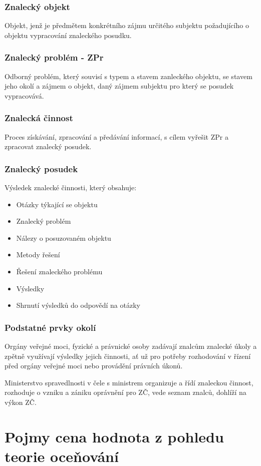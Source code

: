\subsubsection*{Znalecký objekt}
Objekt, jenž je předmětem konkrétního zájmu určitého subjektu požadujícího o objektu vypracování znaleckého posudku.
\subsubsection*{Znalecký problém - ZPr}
Odborný problém, který souvisí s typem a stavem zanleckého objektu, se stavem jeho okolí a zájmem o objekt, daný zájmem subjektu pro který se posudek 
vypracovává.
\subsubsection*{Znalecká činnost}
Proces získávání, zpracování a předávání informací, s cílem vyřešit ZPr a zpracovat znalecký posudek.
\subsubsection*{Znalecký posudek}
Výsledek znalecké činnosti, který obsahuje:
\begin{itemize}
    \item Otázky týkající se objektu
    \item Znalecký problém
    \item Nálezy o posuzovaném objektu
    \item Metody řešení
    \item Řešení znaleckého problému
    \item Výsledky
    \item Shrnutí výsledků do odpovědí na otázky
\end{itemize}

\subsubsection*{Podstatné prvky okolí}
Orgány veřejné moci, fyzické a právnické osoby zadávají znalcům znalecké úkoly a zpětně využívají výsledky jejich činnosti, ať už pro potřeby rozhodování
v řízení před orgány veřejné moci nebo provádění právních úkonů.

Ministerstvo spravedlnosti v čele s ministrem organizuje a řídí znaleckou činnost, rozhoduje o vzniku a zániku oprávnění pro ZČ, vede seznam znalců,
dohlíží na výkon ZČ.

\section{Pojmy cena  hodnota z pohledu teorie oceňování}
